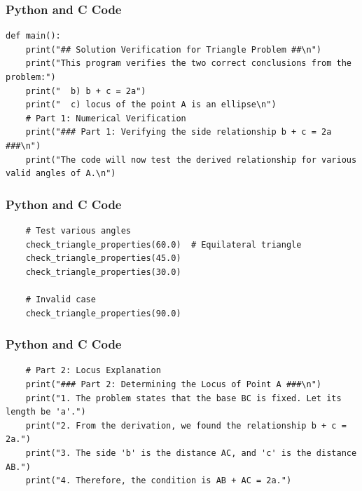 \documentclass{beamer}
\begin{document}
\begin{frame}[fragile]
\frametitle{Python and C Code}
\begin{lstlisting}
def main():
    print("## Solution Verification for Triangle Problem ##\n")
    print("This program verifies the two correct conclusions from the problem:")
    print("  b) b + c = 2a")
    print("  c) locus of the point A is an ellipse\n")
    # Part 1: Numerical Verification
    print("### Part 1: Verifying the side relationship b + c = 2a ###\n")
    print("The code will now test the derived relationship for various valid angles of A.\n")
\end{lstlisting}
\end{frame}

\begin{frame}[fragile]
\frametitle{Python and C Code}
\begin{lstlisting}
    # Test various angles
    check_triangle_properties(60.0)  # Equilateral triangle
    check_triangle_properties(45.0)
    check_triangle_properties(30.0)

    # Invalid case
    check_triangle_properties(90.0)
\end{lstlisting}
\end{frame}

\begin{frame}[fragile]
\frametitle{Python and C Code}
\begin{lstlisting}
    # Part 2: Locus Explanation
    print("### Part 2: Determining the Locus of Point A ###\n")
    print("1. The problem states that the base BC is fixed. Let its length be 'a'.")
    print("2. From the derivation, we found the relationship b + c = 2a.")
    print("3. The side 'b' is the distance AC, and 'c' is the distance AB.")
    print("4. Therefore, the condition is AB + AC = 2a.")
\end{lstlisting}
\end{frame}
\end{document}

